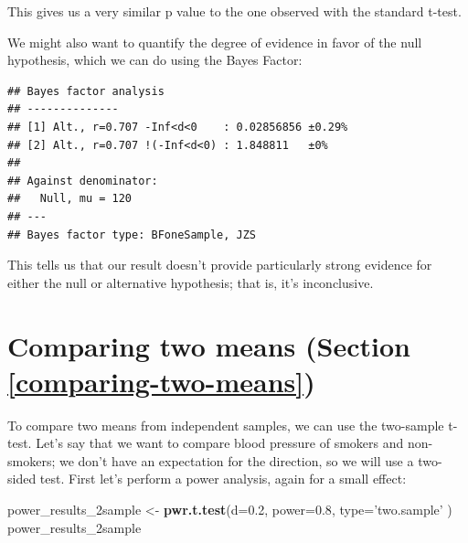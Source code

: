 \documentclass[12pt,]{book}
\newenvironment{Shaded}{\begin{snugshade}}{\end{snugshade}}
\newcommand{\DataTypeTok}[1]{\textcolor[rgb]{0.13,0.29,0.53}{#1}}
\newcommand{\DecValTok}[1]{\textcolor[rgb]{0.00,0.00,0.81}{#1}}
\newcommand{\FloatTok}[1]{\textcolor[rgb]{0.00,0.00,0.81}{#1}}
\newcommand{\KeywordTok}[1]{\textcolor[rgb]{0.13,0.29,0.53}{\textbf{#1}}}
\newcommand{\NormalTok}[1]{#1}
\newcommand{\OperatorTok}[1]{\textcolor[rgb]{0.81,0.36,0.00}{\textbf{#1}}}
\newcommand{\OtherTok}[1]{\textcolor[rgb]{0.56,0.35,0.01}{#1}}
\newcommand{\StringTok}[1]{\textcolor[rgb]{0.31,0.60,0.02}{#1}}
\begin{document}
This gives us a very similar p value to the one observed with the standard t-test.

We might also want to quantify the degree of evidence in favor of the null hypothesis, which we can do using the Bayes Factor:

\begin{Shaded}
\end{Shaded}

\begin{verbatim}
## Bayes factor analysis
## --------------
## [1] Alt., r=0.707 -Inf<d<0    : 0.02856856 ±0.29%
## [2] Alt., r=0.707 !(-Inf<d<0) : 1.848811   ±0%
## 
## Against denominator:
##   Null, mu = 120 
## ---
## Bayes factor type: BFoneSample, JZS
\end{verbatim}

This tells us that our result doesn't provide particularly strong evidence for either the null or alternative hypothesis; that is, it's inconclusive.

\hypertarget{comparing-two-means-section-refcomparing-two-means}{%
\section{Comparing two means (Section \ref{comparing-two-means})}\label{comparing-two-means-section-refcomparing-two-means}}

To compare two means from independent samples, we can use the two-sample t-test. Let's say that we want to compare blood pressure of smokers and non-smokers; we don't have an expectation for the direction, so we will use a two-sided test. First let's perform a power analysis, again for a small effect:

\begin{Shaded}
\begin{Highlighting}[]
\NormalTok{power_results_2sample <-}\StringTok{ }\KeywordTok{pwr.t.test}\NormalTok{(}\DataTypeTok{d=}\FloatTok{0.2}\NormalTok{, }\DataTypeTok{power=}\FloatTok{0.8}\NormalTok{,}
                                    \DataTypeTok{type=}\StringTok{'two.sample'}
\NormalTok{                                    )}
\NormalTok{power_results_2sample}
\end{Highlighting}
\end{Shaded}
\end{document}
